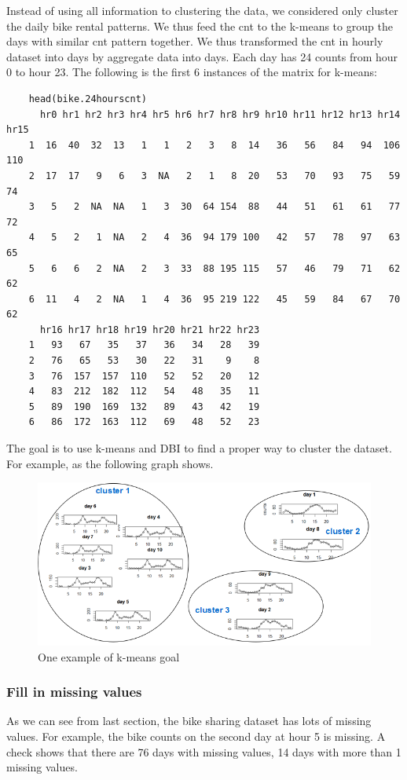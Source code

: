\documentclass[12pt]{article}
\begin{document}
	Instead of using all information to clustering the data, we considered only cluster the daily bike rental patterns. We thus feed the cnt to the k-means to group the days with similar cnt pattern together. We thus transformed the cnt in hourly dataset into days by aggregate data into days. Each day has 24 counts from hour 0 to hour 23.  The following is the first 6 instances of the matrix for k-means: \color{blue}
	\begin{verbatim} 
	head(bike.24hourscnt)
 	  hr0 hr1 hr2 hr3 hr4 hr5 hr6 hr7 hr8 hr9 hr10 hr11 hr12 hr13 hr14 hr15
	1  16  40  32  13   1   1   2   3   8  14   36   56   84   94  106  110
	2  17  17   9   6   3  NA   2   1   8  20   53   70   93   75   59   74
	3   5   2  NA  NA   1   3  30  64 154  88   44   51   61   61   77   72
	4   5   2   1  NA   2   4  36  94 179 100   42   57   78   97   63   65
	5   6   6   2  NA   2   3  33  88 195 115   57   46   79   71   62   62
	6  11   4   2  NA   1   4  36  95 219 122   45   59   84   67   70   62
	  hr16 hr17 hr18 hr19 hr20 hr21 hr22 hr23
	1   93   67   35   37   36   34   28   39
	2   76   65   53   30   22   31    9    8
	3   76  157  157  110   52   52   20   12
	4   83  212  182  112   54   48   35   11
	5   89  190  169  132   89   43   42   19
	6   86  172  163  112   69   48   52   23
	\end{verbatim} \color{black}
	The goal is to use k-means and DBI to find a proper way to cluster the dataset. For example, as the following graph shows.
	\begin{figure}[H]
		\centering
		\includegraphics[scale=.8]{figures/cluster_goal.png}
		\caption{One example of k-means goal}
	\end{figure}
	
	
	\subsubsection{Fill in missing values}
	As we can see from last section, the bike sharing dataset has lots of missing values. For example, the bike counts on the second day at hour 5 is missing. A check shows that there are 76 days with missing values, 14 days with more than 1 missing values. 
	
\end{document}
